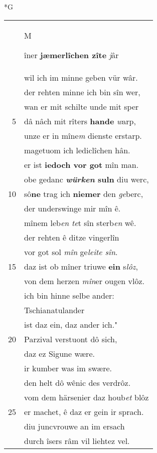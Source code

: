 \documentclass[8pt,a4paper,notitlepage]{article}
\begin{document}
\newpage
\begin{table}[ht]
\begin{minipage}[t]{0.5\linewidth}
\small
\begin{center}*G
\end{center}
\begin{tabular}{rl}
 & \begin{large}M\end{large}îner \textbf{jæmerlîchen zîte} \textit{j}âr\\ 
 & wil ich im minne geben vür wâr.\\ 
 & der rehten minne ich bin sîn wer,\\ 
 & wan er mit schilte unde mit sper\\ 
5 & dâ nâch mit rîters \textbf{hande} \textit{w}arp,\\ 
 & unze er in mîne\textit{m} dienste erstarp.\\ 
 & magetuom ich lediclîchen hân.\\ 
 & er ist \textbf{iedoch vor got} mîn man.\\ 
 & obe gedanc \textbf{\textit{würken} suln} diu werc,\\ 
10 & sô\textbf{ne} trag ich \textbf{niemer} den \textit{ge}berc,\\ 
 & der underswinge mir mîn ê.\\ 
 & mînem leb\textit{en te}t sîn sterb\textit{en} wê.\\ 
 & der rehten ê ditze vingerlîn\\ 
 & vor got sol \textit{mîn} ge\textit{leite sîn}.\\ 
15 & daz ist ob mîner triuwe \textbf{ein} s\textit{lôz},\\ 
 & von dem herzen \textit{mîn}er ougen vlôz.\\ 
 & ich bin hinne selbe ander:\\ 
 & Tschianatulander\\ 
 & ist daz ein, daz ander ich."\\ 
20 & Parzival verstuont dô sich,\\ 
 & daz ez Sigune wære.\\ 
 & ir kumber was im swære.\\ 
 & den helt dô wênic des verdrôz.\\ 
 & vom dem härsenier daz houb\textit{et} blôz\\ 
25 & er machet, ê daz er gein ir sprach.\\ 
 & diu juncvrouwe an im ersach\\ 
 & durch îsers râm vil liehtez vel.\\ 

\end{tabular}
\end{minipage}
\end{table}
\end{document}
